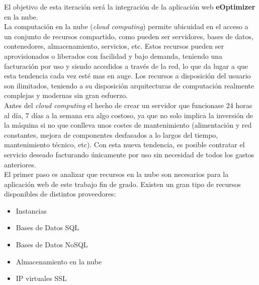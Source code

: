 El objetivo de esta iteración será la integración de la aplicación web \textbf{eOptimizer} en la nube.\\

La computación en la nube (\textit{cloud computing}) permite ubicuidad en el acceso a un conjunto de recursos compartido, como pueden ser servidores, bases de datos, contenedores, almacenamiento, servicios, etc. Estos recursos pueden ser aprovisionados o liberados con facilidad y bajo demanda, teniendo una facturación por uso y siendo accedidos a través de la red, lo que da lugar a que esta tendencia cada vez esté mas en auge. Los recursos a disposición del usuario son ilimitados, teniendo a su disposición arquitecturas de computación realmente complejas y modernas sin gran esfuerzo.\\
Antes del \textit{cloud computing} el hecho de crear un servidor que funcionase 24 horas al día, 7 días a la semana era algo costoso, ya que no solo implica la inversión de la máquina si no que conlleva unos costes de mantenimiento (alimentación y red constantes, mejora de componentes desfasados a lo largos del tiempo, mantenimiento técnico, etc). Con esta nueva tendencia, es posible contratar el servicio deseado facturando únicamente por uso sin necesidad de todos los gastos anteriores.\\

El primer paso es analizar que recursos en la nube son necesarios para la aplicación web de este trabajo fin de grado. Existen un gran tipo de recursos disponibles de distintos proveedores:
\begin{itemize}
\item Instancias
\item Bases de Datos SQL
\item Bases de Datos NoSQL
\item Almacenamiento en la nube
\item IP virtuales SSL
\end{itemize}

